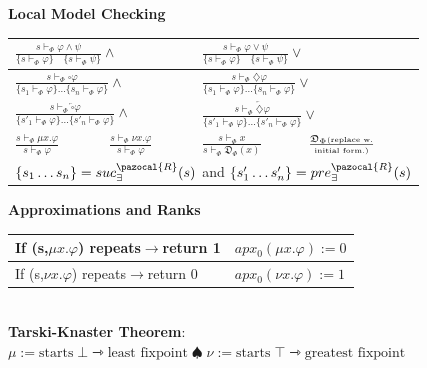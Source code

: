 \documentclass{article}
\newcommand{\Rb}{\pazocal{R}}
\newcommand{\Db}{\mathfrak{D}}
\begin{document}
\begin{multicols}{4}
\textbf{Local Model Checking}
\begin{tabular}{|l|l|l|l|}
\hline
\multicolumn{2}{|l|}{\small$\frac{s \vdash_{\Phi} \varphi \wedge \psi}{\{s \vdash_{\Phi} \varphi \} \quad \{s \vdash_{\Phi} \psi\}} \wedge$} & \multicolumn{2}{|l|}{\small$\frac{s \vdash_{\Phi} \varphi \vee \psi}{\{s \vdash_{\Phi} \varphi \} \quad \{s \vdash_{\Phi} \psi\}} \vee $}\\ \hline
\multicolumn{2}{|l|}{\small$\frac{s \vdash_{\Phi} \square \varphi}{\{s_1 \vdash_{\Phi} \varphi\} \dots \{s_n \vdash_{\Phi} \varphi\}} \wedge$}&\multicolumn{2}{|l|}{\small$\frac{s \vdash_{\Phi} \diamondsuit \varphi}{\{s_1 \vdash_{\Phi} \varphi\} \dots \{s_n \vdash_{\Phi} \varphi\}} \vee$} \\
 \hline
\multicolumn{2}{|l|}{\small$\frac{s \vdash_{\Phi} \overleftarrow{\square} \varphi}{\{s'_1 \vdash_{\Phi} \varphi \}\dots \{ s'_n \vdash_{\Phi} \varphi\}} \wedge$} &\multicolumn{2}{|l|}{\small$\frac{s \vdash_{\Phi} \overleftarrow{\diamondsuit} \varphi}{\{s'_1 \vdash_{\Phi} \varphi \}\dots \{ s'_n \vdash_{\Phi} \varphi\}} \vee$} \\
 \hline
$\frac{s \vdash_{\Phi} \mu x.\varphi}{s \vdash_{\Phi} \varphi}$ &$\frac{s \vdash_{\Phi} \nu x.\varphi}{s \vdash_{\Phi} \varphi}$&$\frac{s \vdash_{\Phi} x}{s \vdash_{\Phi} \Db_{\Phi}(x)}$&$\frac{\Db_{\Phi}\text{\tiny (replace w.}}{\text{\tiny initial form.)}}$\\
 \hline
\multicolumn{4}{|l|}{$\{s_1 \dots s_n \}=suc^{\Rb}_{\exists}({s})$ and $\{s'_1 \dots s'_n \}=pre^{\Rb}_{\exists}({s})$}\\ \hline 
\end{tabular}
\textbf{Approximations and Ranks}
\begin{tabular}{|l|l|}
\hline
If (s,$\mu x.\varphi$) repeats$\rightarrow$return 1&$apx_0(\mu x.\varphi):=0$\\ \hline
If (s,$\nu x.\varphi$) repeats$\rightarrow$return 0& $apx_0(\nu x.\varphi):=1$\\ \hline
\end{tabular} \\


\textbf{Tarski-Knaster Theorem}: $\mu := \text{starts} \; \bot \rightarrowtriangle \text{least fixpoint} \;\spadesuit \; \nu :=\text{starts} \;\top \rightarrowtriangle \text{greatest fixpoint}$


\end{multicols}
\end{document}
